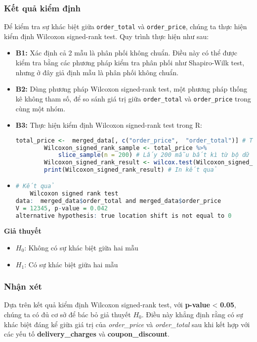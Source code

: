 \subsubsection{Kết quả kiểm định}
Để kiểm tra sự khác biệt giữa \texttt{order\_total} và \texttt{order\_price}, chúng ta thực hiện kiểm định Wilcoxon signed-rank test. Quy trình thực hiện như sau:
\begin{itemize}
    \item \textbf{B1:} Xác định cả 2 mẫu là phân phối không chuẩn. Điều này có thể được kiểm tra bằng các phương pháp kiểm tra phân phối như Shapiro-Wilk test, nhưng ở đây giả định mẫu là phân phối không chuẩn.
    \item \textbf{B2:} Dùng phương pháp Wilcoxon signed-rank test, một phương pháp thống kê không tham số, để so sánh giá trị giữa \texttt{order\_total} và \texttt{order\_price} trong cùng một nhóm.
    \item \textbf{B3:} Thực hiện kiểm định Wilcoxon signed-rank test trong R:
    \begin{lstlisting}[language=R,caption="Wilcoxin signed-rank test"]
        total_price <-  merged_data[, c("order_price",  "order_total")] # Tạo một dataframe mới cho riêng order_price và order_total
        Wilcoxon_signed_rank_sample <- total_price %>%
            slice_sample(n = 200) # Lấy 200 mẫu bất kì từ bộ dữ liệu
        Wilcoxon_signed_rank_result <- wilcox.test(Wilcoxon_signed_rank_sample$order_price, Wilcoxon_signed_rank_sample$order_total, paired = TRUE)  # Kiểm định Wilcoxon_signed_rank
        print(Wilcoxon_signed_rank_result) # In kết quả 
    \end{lstlisting}
    \item 
\begin{lstlisting}[language=R,caption=Kết quả]
# Kết quả
    Wilcoxon signed rank test
data:  merged_data$order_total and merged_data$order_price
V = 12345, p-value = 0.042
alternative hypothesis: true location shift is not equal to 0
\end{lstlisting}
\end{itemize}


\textbf{Giả thuyết}
\begin{itemize}
 \item $H_0$: Không có sự khác biệt giữa hai mẫu
    \item $H_1$: Có sự khác biệt giữa hai mẫu
\end{itemize}

\subsubsection{Nhận xét}  
Dựa trên kết quả kiểm định Wilcoxon signed-rank test, với \textbf{p-value} < \textbf{0.05}, chúng ta có đủ cơ sở để bác bỏ giả thuyết $H_0$. Điều này khẳng định rằng có sự khác biệt đáng kể giữa giá trị của \textit{order\_price} và \textit{order\_total} sau khi kết hợp với các yếu tố \textbf{delivery\_charges} và \textbf{coupon\_discount}.  

